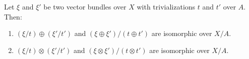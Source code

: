 Let $\xi$ and $\xi'$ be two vector bundles over $X$ with trivializations $t$ and $t'$ over $A$. Then:
\begin{enumerate}
  \item $(\xi/t) \oplus (\xi'/t')$ and $(\xi \oplus \xi')/(t \oplus t')$ are isomorphic over $X/A$.
  \item $(\xi/t) \otimes (\xi'/t')$ and $(\xi \otimes \xi')/(t \otimes t')$ are isomorphic over $X/A$.
\end{enumerate}

